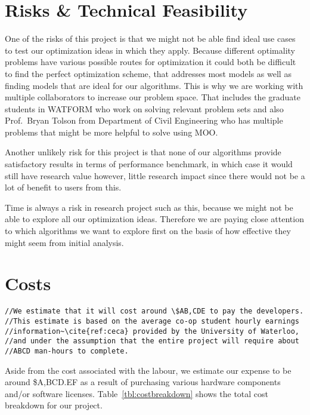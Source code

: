 \documentclass[11pt]{article}
\begin{document}
\section{Risks \& Technical Feasibility}
One of the risks of this project is that we might not be able find
ideal use cases to test our optimization ideas in which they apply.
Because different optimality problems have various possible routes for
optimization it could both be difficult to find the perfect
optimization scheme, that addresses most models as well as finding
models that are ideal for our algorithms. This is why we are working
with multiple collaborators to increase our problem space. That
includes the graduate students in WATFORM who work on solving relevant
problem sets and also Prof.\ Bryan Tolson from Department of Civil
Engineering who has multiple problems that might be more helpful to
solve using MOO.\@

Another unlikely risk for this project is that none of our algorithms
provide satisfactory results in terms of performance benchmark, in
which case it would still have research value however, little research
impact since there would not be a lot of benefit to users from this.

Time is always a risk in research project such as this, because we
might not be able to explore all our optimization ideas. Therefore we
are paying close attention to which algorithms we want to explore first
on the basis of how effective they might seem from initial analysis.

\section{Costs}
\begin{verbatim}
//We estimate that it will cost around \$AB,CDE to pay the developers.
//This estimate is based on the average co-op student hourly earnings
//information~\cite{ref:ceca} provided by the University of Waterloo,
//and under the assumption that the entire project will require about 
//ABCD man-hours to complete.
\end{verbatim}

Aside from the cost associated with the labour, we estimate our expense
to be around \$A,BCD.EF as a result of purchasing various hardware
components and/or software licenses. Table~\ref{tbl:costbreakdown} shows the
total cost breakdown for our project.
\end{document}
